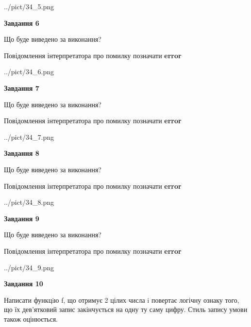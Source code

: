 \documentclass[12pt, ukrainian]{article}
\begin{document}
{\begin {large}
\begin{center}
	{../pict/34_5.png}
\end{center}
\newpage

{\begin {center}\textbf{Завдання 6}\end {center}}\par
Що буде виведено за виконання? \par
Повідомлення інтерпретатора про помилку позначати \textbf{error}

\begin{center}
	{../pict/34_6.png}
\end{center}
\newpage

{\begin {center}\textbf{Завдання 7}\end {center}}\par
Що буде виведено за виконання? \par
Повідомлення інтерпретатора про помилку позначати \textbf{error}

\begin{center}
	{../pict/34_7.png}
\end{center}
\newpage

{\begin {center}\textbf{Завдання 8}\end {center}}\par
Що буде виведено за виконання? \par
Повідомлення інтерпретатора про помилку позначати \textbf{error}

\begin{center}
	{../pict/34_8.png}
\end{center}
\newpage

{\begin {center}\textbf{Завдання 9}\end {center}}\par
Що буде виведено за виконання? \par
Повідомлення інтерпретатора про помилку позначати \textbf{error}

\begin{center}
	{../pict/34_9.png}
\end{center}
\newpage

{\begin {center}\textbf{Завдання 10}\end {center}}\par

Написати функцiю f, що отримує 2 цілих числа i повертає логічну ознаку того, що їх дев'ятковий запис закінчується на одну ту саму цифру. Стиль запису умови також оцінюється.\par
\newpage

\end {large}}
\end{document}
